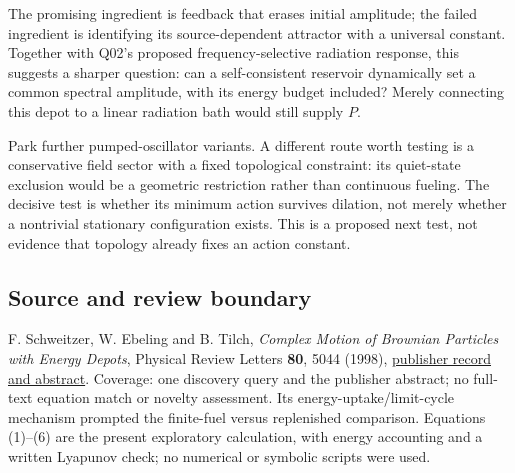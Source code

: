 \documentclass[11pt,a4paper]{article}
\begin{document}
The promising ingredient is feedback that erases initial amplitude; the
failed ingredient is identifying its source-dependent attractor with a
universal constant. Together with Q02's proposed frequency-selective
radiation response, this suggests a sharper question: can a
self-consistent reservoir dynamically set a common spectral amplitude,
with its energy budget included? Merely connecting this depot to a
linear radiation bath would still supply \(P\).

Park further pumped-oscillator variants. A different route worth testing
is a conservative field sector with a fixed topological constraint: its
quiet-state exclusion would be a geometric restriction rather than
continuous fueling. The decisive test is whether its minimum action
survives dilation, not merely whether a nontrivial stationary
configuration exists. This is a proposed next test, not evidence that
topology already fixes an action constant.

\hypertarget{source-and-review-boundary}{%
\subsection{Source and review
boundary}\label{source-and-review-boundary}}

F. Schweitzer, W. Ebeling and B. Tilch, \emph{Complex Motion of Brownian
Particles with Energy Depots}, Physical Review Letters \textbf{80}, 5044
(1998),
\href{https://journals.aps.org/prl/abstract/10.1103/PhysRevLett.80.5044}{publisher
record and abstract}. Coverage: one discovery query and the publisher
abstract; no full-text equation match or novelty assessment. Its
energy-uptake/limit-cycle mechanism prompted the finite-fuel versus
replenished comparison. Equations (1)--(6) are the present exploratory
calculation, with energy accounting and a written Lyapunov check; no
numerical or symbolic scripts were used.
\end{document}
